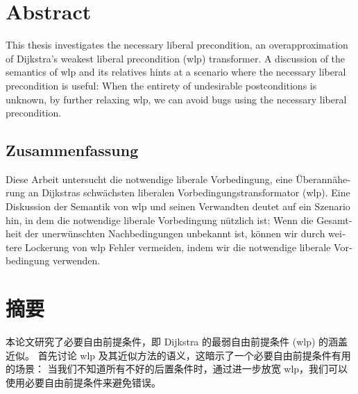 \begingroup
\let\clearpage\relax
\let\cleardoublepage\relax
\let\cleardoublepage\relax

\chapter*{Abstract}
This thesis investigates the necessary liberal precondition, an overapproximation of Dijkstra's weakest liberal precondition (wlp) transformer. 
A discussion of the semantics of wlp and its relatives hints at a scenario where the necessary liberal precondition is useful: 
When the entirety of undesirable postconditions is unknown, by further relaxing wlp, we can avoid bugs using the necessary liberal precondition. 

\vfill

\begin{otherlanguage}{ngerman}
\chapter*{Zusammenfassung}
Diese Arbeit untersucht die notwendige liberale Vorbedingung, eine Überannäherung an Dijkstras schwächsten liberalen Vorbedingungstransformator (wlp).
Eine Diskussion der Semantik von wlp und seinen Verwandten deutet auf ein Szenario hin, in dem die notwendige liberale Vorbedingung nützlich ist:
Wenn die Gesamtheit der unerwünschten Nachbedingungen unbekannt ist, können wir durch weitere Lockerung von wlp Fehler vermeiden, indem wir die notwendige liberale Vorbedingung verwenden.
\end{otherlanguage}

\vfill


\chapter*{摘要}
本论文研究了必要自由前提条件，即 Dijkstra 的最弱自由前提条件 (wlp) 的涵盖近似。
首先讨论 wlp 及其近似方法的语义，这暗示了一个必要自由前提条件有用的场景：
当我们不知道所有不好的后置条件时，通过进一步放宽 wlp，我们可以使用必要自由前提条件来避免错误。


\vfill

\endgroup